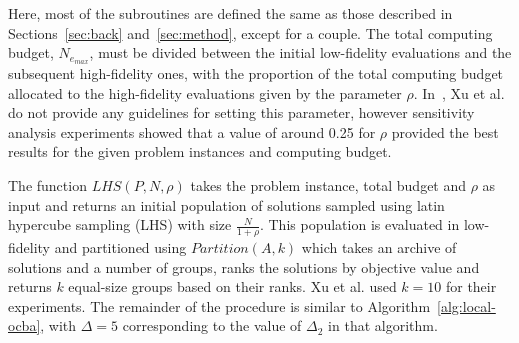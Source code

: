 Here, most of the subroutines are defined the same as those described in Sections~\ref{sec:back} and~\ref{sec:method}, except for a couple. The total computing budget, $N_{e_{max}}$, must be divided between the initial low-fidelity evaluations and the subsequent high-fidelity ones, with the proportion of the total computing budget allocated to the high-fidelity evaluations given by the parameter $\rho$. In~\cite{xu2016mo2tos}, Xu et al. do not provide any guidelines for setting this parameter, however sensitivity analysis experiments showed that a value of around 0.25 for $\rho$ provided the best results for the given problem instances and computing budget. 

The function $LHS(P,N,\rho)$ takes the problem instance, total budget and $\rho$ as input and returns an initial population of solutions sampled using latin hypercube sampling (LHS) with size $\frac{N}{1+\rho}$. This population is evaluated in low-fidelity and partitioned using $Partition(A,k)$ which takes an archive of solutions and a number of groups, ranks the solutions by objective value and returns $k$ equal-size groups based on their ranks. Xu et al. used $k=10$ for their experiments. The remainder of the procedure is similar to Algorithm~\ref{alg:local-ocba}, with $\Delta = 5$ corresponding to the value of $\Delta_2$ in that algorithm.